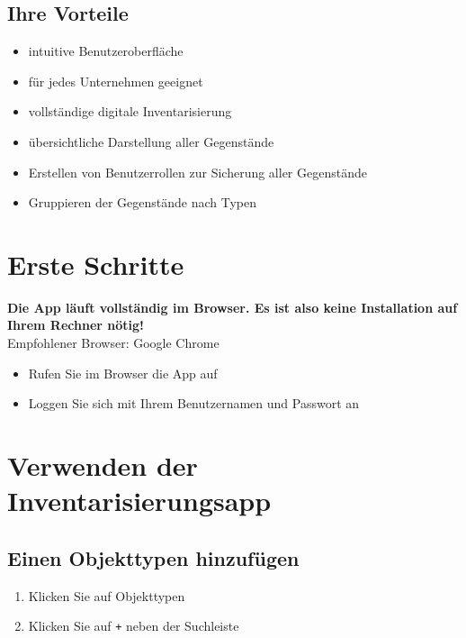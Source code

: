 \documentclass[11pt,a4paper]{report}
\begin{document}
	\subsection{Ihre Vorteile}
	\begin{itemize}
		\item intuitive Benutzeroberfläche
		\item für jedes Unternehmen geeignet
		\item vollständige digitale Inventarisierung
		\item übersichtliche Darstellung aller Gegenstände
		\item Erstellen von Benutzerrollen zur Sicherung aller Gegenstände
		\item Gruppieren der Gegenstände nach Typen
	\end{itemize}
	\section{Erste Schritte}
	\textbf{Die App läuft vollständig im Browser. Es ist also keine Installation auf Ihrem Rechner nötig!}\\
	Empfohlener Browser: Google Chrome
	
	\begin{itemize}
		\item Rufen Sie im Browser die App auf
		\item Loggen Sie sich mit Ihrem Benutzernamen und Passwort an
	\end{itemize}
	
	\section{Verwenden der Inventarisierungsapp}
	\subsection{Einen Objekttypen hinzufügen}
	
	\begin{enumerate}
		\item Klicken Sie auf \glqq{}Objekttypen\grqq{}
		\item Klicken Sie auf \texttt{+} neben der Suchleiste
	\end{enumerate}\\
\end{document}
